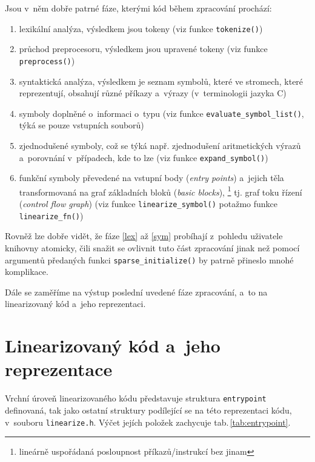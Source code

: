 Jsou v~něm dobře patrné fáze, kterými kód během zpracování prochází:
\begin{enumerate}
    \item\label{lex} lexikální analýza, výsledkem jsou tokeny (viz funkce \texttt{tokenize()})
    \item průchod preprocesoru, výsledkem jsou upravené tokeny (viz funkce \texttt{preprocess()})
    \item syntaktická analýza, výsledkem je seznam symbolů,
          které ve stromech, které reprezentují, obsahují různé
          příkazy a~výrazy (v~terminologii jazyka C)
    \item\label{sym} symboly doplněné o~informaci o~typu (viz funkce \texttt{evaluate\_symbol\_list()},
          týká se pouze vstupních souborů)
    \item zjednodušené symboly, což se týká např. zjednodušení aritmetických výrazů
          a~porovnání v~případech, kde to lze (viz funkce \texttt{expand\_symbol()})
    \item funkční symboly převedené na vstupní body (\emph{entry points})
          a~jejich těla transformovaná na graf základních bloků (\emph{basic blocks}),
          \footnote{lineárně uspořádaná posloupnost příkazů/instrukcí bez  jinam}
          tj. graf toku řízení (\emph{control flow graph}) (viz funkce \texttt{linearize\_symbol()}
          potažmo funkce \texttt{linearize\_fn()})
\end{enumerate}

Rovněž lze dobře vidět, že fáze \ref{lex} až \ref{sym} probíhají z~pohledu
uživatele knihovny atomicky, čili snažit se ovlivnit tuto část zpracování
jinak než pomocí argumentů předaných funkci \texttt{sparse\_initialize()}
by patrně přineslo mnohé komplikace.

Dále se zaměříme na výstup poslední uvedené fáze zpracování, a~to na linearizovaný
kód a~jeho reprezentaci.

\section{Linearizovaný kód a~jeho reprezentace}

Vrchní úroveň linearizovaného kódu představuje struktura \texttt{entrypoint}
definovaná, tak jako ostatní struktury podílející se na této
reprezentaci kódu, v~souboru \texttt{linearize.h}. Výčet jejích položek
zachycuje tab.\,\ref{tab:entrypoint}.

